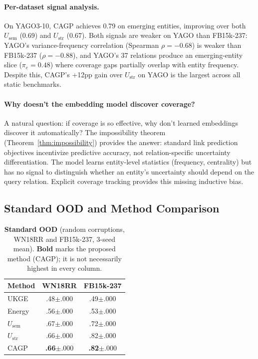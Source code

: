 \documentclass{article}
\begin{document}
\paragraph{Per-dataset signal analysis.}
On YAGO3-10, CAGP achieves 0.79 on emerging entities, improving over both $U_{\text{sem}}$ (0.69) and $U_{\text{str}}$ (0.67). Both signals are weaker on YAGO than FB15k-237: YAGO's variance-frequency correlation (Spearman $\rho{=}{-}0.68$) is weaker than FB15k-237 ($\rho{=}{-}0.88$), and YAGO's 37 relations produce an emerging-entity slice ($\pi_e{=}0.48$) where coverage gaps partially overlap with entity frequency. Despite this, CAGP's +12pp gain over $U_{\text{str}}$ on YAGO is the largest across all static benchmarks.

\paragraph{Why doesn't the embedding model discover coverage?}
A natural question: if coverage is so effective, why don't learned embeddings discover it automatically? The impossibility theorem (Theorem~\ref{thm:impossibility}) provides the answer: standard link prediction objectives incentivize predictive accuracy, not relation-specific uncertainty differentiation. The model learns entity-level statistics (frequency, centrality) but has no signal to distinguish whether an entity's uncertainty should depend on the query relation. Explicit coverage tracking provides this missing inductive bias.

\subsection{Standard OOD and Method Comparison}
\label{app:standard_ood_full}

\begin{table}[ht]
\centering
\caption{\textbf{Standard OOD} (random corruptions, WN18RR and FB15k-237, 3-seed mean). \textbf{Bold} marks the proposed method (CAGP); it is not necessarily highest in every column.}
\label{tab:standard}
\scriptsize
\setlength{\tabcolsep}{4pt}
\begin{tabular}{lcc}
\toprule
Method & WN18RR & FB15k-237 \\
\midrule
UKGE & .48{\scriptsize$\pm$.000} & .49{\scriptsize$\pm$.000} \\
Energy & .56{\scriptsize$\pm$.000} & .53{\scriptsize$\pm$.000} \\
\midrule
$U_{\text{sem}}$ & .67{\scriptsize$\pm$.000} & .72{\scriptsize$\pm$.000} \\
$U_{\text{str}}$ & .66{\scriptsize$\pm$.000} & .82{\scriptsize$\pm$.000} \\
\midrule
CAGP & \textbf{.66}{\scriptsize$\pm$.000} & \textbf{.82}{\scriptsize$\pm$.000} \\
\bottomrule
\end{tabular}
\end{table}
\end{document}

